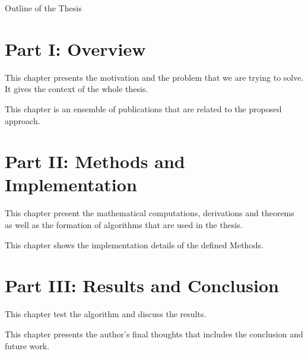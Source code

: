 \clearemptydoublepage

{}

\begin{center}
	\huge{Outline of the Thesis}
\end{center}




\section*{Part I: Overview}

  \vspace{1mm}

\noindent This chapter presents the motivation and the problem that we are trying to solve. It gives the context of the whole thesis. \\ 

  \vspace{1mm}

\noindent  This chapter is an ensemble of publications that are related to the proposed approach. \\

\section*{Part II: Methods and Implementation}

  \vspace{1mm}

\noindent This chapter present the mathematical computations, derivations and theorems as well as the formation of algorithms that are used in the thesis. \\ 


  \vspace{1mm}

\noindent  This chapter shows the implementation details of the defined Methods. \\

\section*{Part III: Results and Conclusion}

  \vspace{1mm}

\noindent  This chapter test the algorithm and discuss the results. \\

  \vspace{1mm}

\noindent  This chapter presents the author's final thoughts that includes the conclusion and future work.